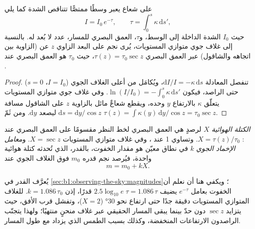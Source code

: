 \begin{proposition}\label{prop:b1:observing-the-sky:bouguer}
على شعاع يعبر وسطًا ممتصًّا تتناقص الشدة كما يلي
\[
  I = I_0\,e^{-\tau}, \qquad \tau = \int_0^s \kappa\,\mathrm ds' ,
\]
حيث $I_0$ الشدة الداخلة إلى الوسط، و$\tau$، العمق البصري للمسار، عدد لا بُعد له.
بالنسبة إلى غلاف جوي متوازي المستويات، يُرى نجم على البعد الزاوي $z$ عن  (الزاوية بين اتجاهه والشاقول) عبر العمق البصري $\tau(z) = \tau_0\sec z$، حيث $\tau_0$ هو العمق البصري عند .
\end{proposition}

\begin{proof}
تنفصل المعادلة $\mathrm dI/I = -\kappa\,\mathrm ds$، ويُكامَل من أعلى الغلاف الجوي ($I = I_0$، $s = 0$) حتى الراصد، فيكون
$\ln(I/I_0) = -\int_0^s\kappa\,\mathrm ds'$. وفي غلاف جوي متوازي المستويات
يتعلّق $\kappa$ بالارتفاع $y$ وحده، ويقطع شعاعٌ مائل بالزاوية $z$ على الشاقول مسافة $\mathrm ds = \mathrm dy/\cos z$ ليصعد $\mathrm dy$. ومن ثَمّ
$\tau(z) = \int \kappa(y)\,\mathrm dy/\cos z = \tau_0\sec z$.
\end{proof}

\begin{definition}\label{def:b1:observing-the-sky:extinction}
\emph{الكتلة الهوائية} $X$ لرصدٍ هي العمق البصري لخط النظر مقسومًا على العمق البصري عند : $X = \tau(z)/\tau_0$. وتساوي 1 عند ، وفي غلاف متوازي المستويات $X = \sec z$. و\emph{معامل الإخماد الجوي} $k$ في نطاق معيّن هو مقدار الخفوت، بالقدر، الذي تُحدثه كتلة هوائية واحدة، فيُرصد نجم قدره $m_0$ فوق الغلاف الجوي عند
\[
  m = m_0 + kX .
\]
\end{definition}

يُعرَّف القدر في \cref{sec:b1:observing-the-sky:magnitudes}؛ ويكفي هنا أن نعلم أن الخفوت بعامل $e^{-\tau}$ يضيف $2.5\log_{10}e\;\tau = 1.086\,\tau$ قدرًا، إذن $k = 1.086\,\tau_0$.  للغلاف المتوازي المستويات دقيقة جدًا حتى ارتفاع نحو \ang{30} ($X = 2$)، وتفشل قرب الأفق، حيث يتزايد $\sec z$ دون حدّ بينما يبقى المسار الحقيقي عبر غلاف منحنٍ منتهيًا؛ ولهذا يتجنّب الراصدون الارتفاعات المنخفضة، وكذلك بسبب الطمس الذي يزداد مع طول المسار.

